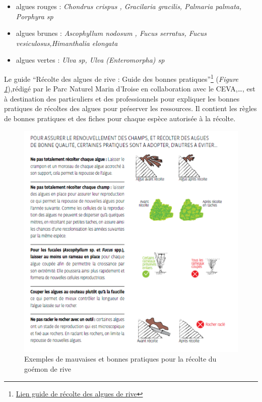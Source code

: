 \documentclass[
]{book}
\begin{document}
\begin{itemize}
\item
  algues rouges : \emph{Chondrus crispus , Gracilaria gracilis, Palmaria palmata, Porphyra sp}
\item
  algues brunes : \emph{Ascophyllum nodosum , Fucus serratus, Fucus vesiculosus,Himanthalia elongata}
\item
  algues vertes : \emph{Ulva sp, Ulva (Enteromorpha) sp}
\end{itemize}

Le guide ``Récolte des algues de rive : Guide des bonnes pratiques''\footnote{\href{http://www.parc-marin-iroise.fr/Documentation/Guide-des-bonnes-pratiques-des-recoltants-d-algues-de-rive/Guide-de-bonnes-pratiques-recolte-des-algues-de-rive}{Lien guide de récolte des algues de rive}} (\emph{Figure \ref{fig:alguepratique}}),rédigé par le Parc Naturel Marin d'Iroise en collaboration avec le CEVA,\ldots, est à destination des particuliers et des professionnels pour expliquer les bonnes pratiques de récoltes des algues pour préserver les ressources. Il contient les règles de bonnes pratiques et des fiches pour chaque espèce autorisée à la récolte.

\begin{figure}

{\centering \includegraphics{images/alguerivepratique} 

}

\caption{Exemples de mauvaises et bonnes pratiques pour la récolte du goémon de rive}\label{fig:alguepratique}
\end{figure}
\end{document}

